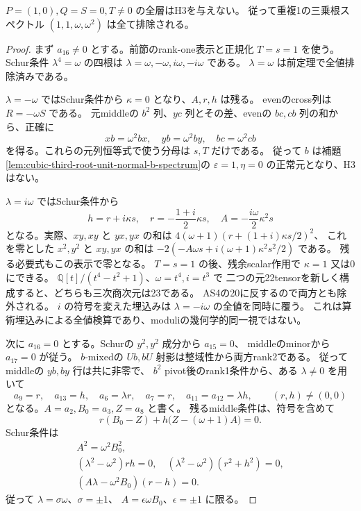 \begin{theorem}[片方零結合の全残余排除]
\label{thm:cubic-third-root-unit-onezero-complete}
$P=(1,0),Q=S=0,T\ne0$ の全層はH3を与えない。
従って重複1の三乗根スペクトル $(1,1,\omega,\omega^2)$ は全て排除される。
\end{theorem}
\begin{proof}
まず $a_{16}\ne0$ とする。前節のrank-one表示と正規化 $T=s=1$ を使う。
Schur条件 $\lambda^4=\omega$ の四根は
$\lambda=\omega,-\omega,i\omega,-i\omega$ である。
$\lambda=\omega$ は前定理で全値排除済みである。

$\lambda=-\omega$ ではSchur条件から $\kappa=0$ となり、$A,r,h$ は残る。
evenのcross列は $R=-\omega S$ である。
元middleの $b^2$ 列、$yc$ 列とその差、evenの $bc,cb$ 列の和から、正確に
\[
 xb=\omega^2bx,\quad yb=\omega^2by,\quad bc=\omega^2cb
\]
を得る。これらの元列恒等式で使う分母は $s,T$ だけである。
従って $b$ は補題\ref{lem:cubic-third-root-unit-normal-b-spectrum}の
$\varepsilon=1,\eta=0$ の正常元となり、H3はない。

$\lambda=i\omega$ ではSchur条件から
\[
 h=r+i\kappa s,\quad
 r=-\frac{1+i}{2}\kappa s,\quad
 A=-\frac{i\omega}{2}\kappa^2s
\]
となる。実際、$xy,xy$ と $yx,yx$ の和は
$4(\omega+1)(r+(1+i)\kappa s/2)^2$、
これを零とした $x^2,y^2$ と $xy,yx$ の和は
$-2(-A\omega s+i(\omega+1)\kappa^2s^2/2)$ である。
残る必要式もこの表示で零となる。
$T=s=1$ の後、残余scalar作用で $\kappa=1$ 又は0にできる。
$\mathbb Q[t]/(t^4-t^2+1)$、$\omega=t^4,i=t^3$ で
二つの元22tensorを新しく構成すると、どちらも三次商次元は23である。
AS4の20に反するので両方とも除外される。
$i$ の符号を変えた埋込みは $\lambda=-i\omega$ の全値を同時に覆う。
これは算術埋込みによる全値検算であり、moduliの幾何学的同一視ではない。

次に $a_{16}=0$ とする。Schurの $y^2,y^2$ 成分から $a_{15}=0$、
middleのminorから $a_{17}=0$ が従う。
$b$-mixedの $Ub,bU$ 射影は整域性から両方rank2である。
従ってmiddleの $yb,by$ 行は共に非零で、
$b^2$ pivot後のrank1条件から、ある $\lambda\ne0$ を用いて
\[
 a_9=r,\quad a_{13}=h,\quad
 a_6=\lambda r,\quad a_7=r,\quad
 a_{11}=a_{12}=\lambda h,\qquad (r,h)\ne(0,0)
\]
となる。$A=a_2,B_0=a_3,Z=a_8$ と書く。
残るmiddle条件は、符号を含めて
\[
 r(B_0-Z)+h\bigl(Z-(\omega+1)A\bigr)=0.
\tag{M0}
\]
Schur条件は
\begin{gather*}
 A^2=\omega^2B_0^2,\\
 (\lambda^2-\omega^2)rh=0,\quad
 (\lambda^2-\omega^2)(r^2+h^2)=0,\\
 (A\lambda-\omega^2B_0)(r-h)=0.
\end{gather*}
従って $\lambda=\sigma\omega$、$\sigma=\pm1$、
$A=\epsilon\omega B_0$、$\epsilon=\pm1$ に限る。


\end{proof}
